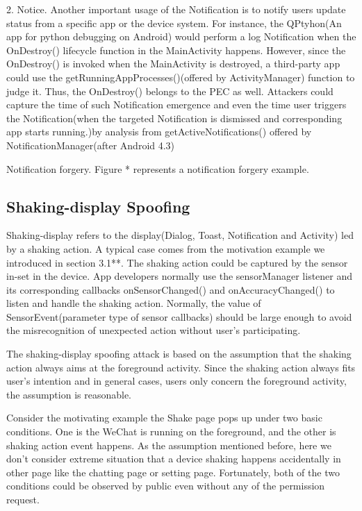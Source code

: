 \documentclass{sig-alternate-05-2015}
\begin{document}
2. Notice. Another important usage of the Notification is to notify users update status from a specific app or the device system. For instance, the QPtyhon(An app for python debugging on Android) would perform a log Notification when the OnDestroy() lifecycle function in the MainActivity happens. However, since the OnDestroy() is invoked when the MainActivity is destroyed, a third-party app could use the getRunningAppProcesses()(offered by ActivityManager) function to judge it. Thus, the OnDestroy() belongs to the PEC as well. Attackers could capture the time of such Notification emergence and even the time user triggers the Notification(when the targeted Notification is dismissed and corresponding app starts running.)by analysis from getActiveNotifications() offered by NotificationManager(after Android 4.3) 

Notification forgery. Figure * represents a notification forgery example. 

\subsection{Shaking-display Spoofing}
Shaking-display refers to the display(Dialog, Toast, Notification and Activity) led by a shaking action. A typical case comes from the motivation example we introduced in section 3.1**. The shaking action could be captured by the sensor in-set in the device. App developers normally use the sensorManager listener and its corresponding callbacks onSensorChanged() and onAccuracyChanged() to listen and handle the shaking action. Normally, the value of SensorEvent(parameter type of sensor callbacks) should be large enough to avoid the misrecognition of unexpected action without user's participating.

The shaking-display spoofing attack is based on the assumption that the shaking action always aims at the foreground activity. Since the shaking action always fits user's intention and in general cases, users only concern the foreground activity, the assumption is reasonable.

Consider the motivating example the Shake page pops up under two basic conditions. One is the WeChat is running on the foreground, and the other is shaking action event happens. As the assumption mentioned before, here we don't consider extreme situation that a device shaking happens accidentally in other page like the chatting page or setting page. Fortunately, both of the two conditions could be observed by public even without any of the permission request. 
\end{document}

